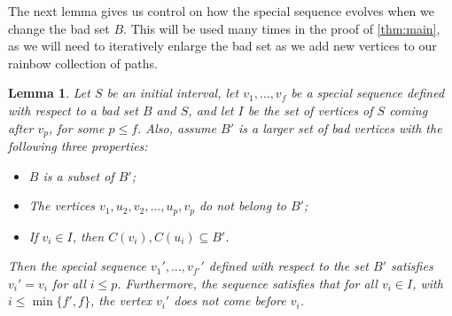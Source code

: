 \documentclass[a4paper,11pt]{article}
\newtheorem{lemma}[theorem]{\bf Lemma}
\theoremstyle{definition}
\begin{document}
The next lemma gives us control on how the special sequence evolves when we change the bad set $B$. This will be used many times in the proof of \cref{thm:main}, as we will need to iteratively enlarge the bad set as we add new vertices to our rainbow collection of paths.

\begin{lemma}\label{lemma:unchanged special sequence}
Let $S$ be an initial interval, let $v_1, \dots, v_f$ be a special sequence defined with respect to a bad set $B$ and $S$, and let $I$ be the set of vertices of $S$ coming after $v_p$, for some $p\leq f$.
Also, assume $B'$ is a larger set of bad vertices with the following three properties:
\begin{itemize}
    \item $B$ is a subset of $B'$;
    \item The vertices $v_1, u_2, v_2, \dots, u_p, v_p$ do not belong to $B'$;
    \item If $v_i\in I$, then $C(v_i), C(u_i)\subseteq B'$. 
\end{itemize}
Then the special sequence $v_1', \dots, v_{f'}'$ defined with respect to the set $B'$ satisfies $v_i'=v_i$ for all $i\leq p$. Furthermore, the sequence satisfies that for all $v_i\in I$, with $i\leq \min\{f', f\}$, the vertex $v_i'$ does not come before $v_i$. 
\end{lemma}
\end{document}
